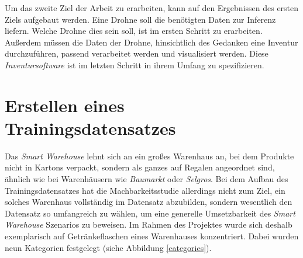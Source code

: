 Um das zweite Ziel der Arbeit zu erarbeiten, kann auf den Ergebnissen des ersten Ziels aufgebaut werden. Eine Drohne soll die benötigten Daten zur Inferenz liefern. Welche Drohne dies sein soll, ist im ersten Schritt zu erarbeiten. Außerdem müssen die Daten der Drohne, hinsichtlich des Gedanken eine Inventur durchzuführen, passend verarbeitet werden und visualisiert werden. Diese \textit{Inventursoftware} ist im letzten Schritt in ihrem Umfang zu spezifizieren.

\section{Erstellen eines Trainingsdatensatzes} \label{traindata}

Das \textit{Smart Warehouse} lehnt sich an ein großes Warenhaus an, bei dem Produkte nicht in Kartons verpackt, sondern als ganzes auf Regalen angeordnet sind, ähnlich wie bei Warenhäusern wie \textit{Baumarkt} oder \textit{Selgros}. Bei dem Aufbau des Trainingsdatensatzes hat die Machbarkeitsstudie allerdings nicht zum Ziel, ein solches Warenhaus vollständig im Datensatz abzubilden, sondern wesentlich den Datensatz so umfangreich zu wählen, um eine generelle Umsetzbarkeit des \textit{Smart Warehouse} Szenarios zu beweisen. Im Rahmen des Projektes wurde sich deshalb exemplarisch auf Getränkeflaschen eines Warenhauses konzentriert. Dabei wurden neun Kategorien festgelegt (siehe Abbildung \ref{categories}). 

